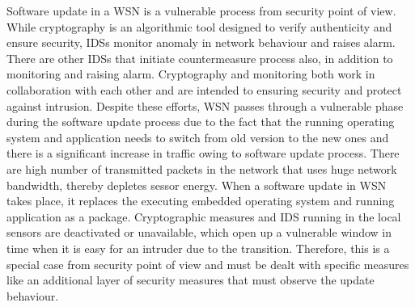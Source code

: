 \documentclass[conference,man]{IEEEtran}
\begin{document}
Software update in a WSN is a vulnerable process from security point of view.
While cryptography  is an algorithmic  tool designed to verify authenticity and ensure security, IDSs  monitor anomaly in network behaviour  and raises alarm. 
There are other IDSs that initiate  countermeasure process also, in addition to monitoring and raising alarm. 
Cryptography and monitoring both work in collaboration with each other and are intended to ensuring security and protect  against intrusion.
Despite these efforts, WSN passes through a vulnerable phase during the software update process due to the fact that the running operating system and application needs to switch from old version to the new ones and there is a significant increase in traffic owing to software update process.
There are high number of transmitted packets in the network that uses huge network bandwidth, thereby depletes sessor energy.
When a software update in WSN takes place, it replaces the executing embedded operating system and running application as a package.
Cryptographic measures and IDS running in the local sensors are deactivated or unavailable, which open up a vulnerable  window in time when it is easy for an intruder due to the transition.
Therefore, this is a special case from security point of view and must be dealt with specific measures like an additional layer of security measures that must observe the update behaviour. 

\end{document}
